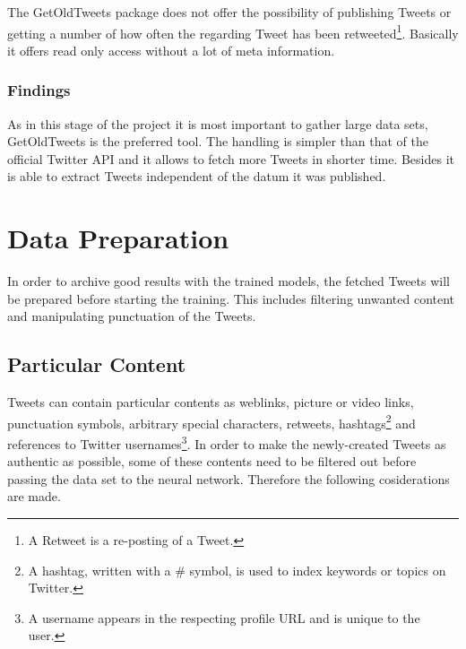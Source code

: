 \documentclass[conference]{IEEEtran}
\begin{document}
The GetOldTweets package does not offer the possibility of publishing Tweets or getting a number of how often the regarding Tweet has been retweeted\footnote{A Retweet is a re-posting of a Tweet.}. Basically it offers read only access without a lot of meta information.

\subsubsection{Findings}

As in this stage of the project it is most important to gather large data sets, GetOldTweets is the preferred tool. The handling is simpler than that of the official Twitter API and it allows to fetch more Tweets in shorter time. Besides it is able to extract Tweets independent of the datum it was published. 

%

\section{Data Preparation}

In order to archive good results with the trained models, the fetched Tweets will be prepared before starting the training. This includes filtering unwanted content and manipulating punctuation of the Tweets. 

\subsection{Particular Content}\label{subsec_particular_content}

Tweets can contain particular contents as weblinks, picture or video links, punctuation symbols, arbitrary special characters, retweets, hashtags\footnote{A hashtag, written with a \# symbol, is used to index keywords or topics on Twitter.} and references to Twitter usernames\footnote{A username appears in the respecting profile URL and is unique to the user.}. In order to make the newly-created Tweets as authentic as possible, some of these contents need to be filtered out before passing the data set to the neural network. Therefore the following cosiderations are made.\\
\end{document}
